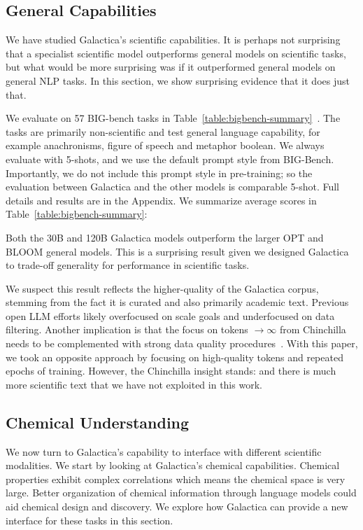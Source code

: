{\subsection{General Capabilities}

We have studied Galactica's scientific capabilities. It is perhaps not surprising that a specialist scientific model outperforms general models on scientific tasks, but what would be more surprising was if it outperformed general models on general NLP tasks. In this section, we show surprising evidence that it does just that.

We evaluate on 57 BIG-bench tasks in Table~\ref{table:bigbench-summary}~\citep{BIGBenchakasomanyauthorsitdoesntfitinthecontextwindow}. The tasks are primarily non-scientific and test general language capability, for example anachronisms, figure of speech and metaphor boolean. We always evaluate with 5-shots, and we use the default prompt style from BIG-Bench. Importantly, we do not include this prompt style in pre-training; so the evaluation between Galactica and the other models is comparable 5-shot. Full details and results are in the Appendix. We summarize average scores in Table~\ref{table:bigbench-summary}:

Both the 30B and 120B Galactica models outperform the larger OPT and BLOOM general models. This is a surprising result given we designed Galactica to trade-off generality for performance in scientific tasks. 

We suspect this result reflects the higher-quality of the Galactica corpus, stemming from the fact it is curated and also primarily academic text. Previous open LLM efforts likely overfocused on scale goals and underfocused on data filtering. Another implication is that the focus on tokens $\rightarrow \infty$ from Chinchilla needs to be complemented with strong data quality procedures~\citep{Chinchilla}. With this paper, we took an opposite approach by focusing on high-quality tokens and repeated epochs of training. However, the Chinchilla insight stands: and there is much more scientific text that we have not exploited in this work.

\subsection{Chemical Understanding}

We now turn to Galactica's capability to interface with different scientific modalities. We start by looking at Galactica's chemical capabilities. Chemical properties exhibit complex correlations which means the chemical space is very large. Better organization of chemical information through language models could aid chemical design and discovery. We explore how Galactica can provide a new interface for these tasks in this section.

}
